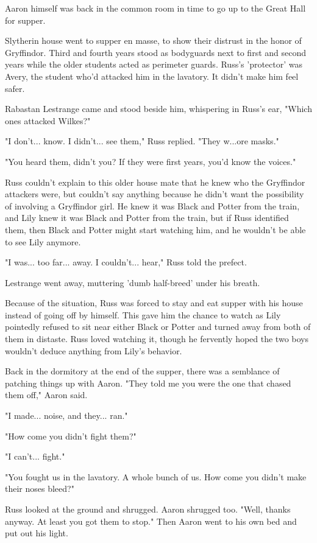 \documentclass[a4paper,11pt]{article}
\begin{document}
Aaron himself was back in the common room in time to go up to the Great Hall for supper.

Slytherin house went to supper en masse, to show their distrust in the honor of Gryffindor. Third and fourth years stood as bodyguards next to first and second years while the older students acted as perimeter guards. Russ's 'protector' was Avery, the student who'd attacked him in the lavatory. It didn't make him feel safer.

Rabastan Lestrange came and stood beside him, whispering in Russ's ear, "Which ones attacked Wilkes?"

"I don't... know. I didn't... see them," Russ replied. "They w...ore masks."

"You heard them, didn't you? If they were first years, you'd know the voices."

Russ couldn't explain to this older house mate that he knew who the Gryffindor attackers were, but couldn't say anything because he didn't want the possibility of involving a Gryffindor girl. He knew it was Black and Potter from the train, and Lily knew it was Black and Potter from the train, but if Russ identified them, then Black and Potter might start watching him, and he wouldn't be able to see Lily anymore.

"I was... too far... away. I couldn't... hear," Russ told the prefect.

Lestrange went away, muttering 'dumb half-breed' under his breath.

Because of the situation, Russ was forced to stay and eat supper with his house instead of going off by himself. This gave him the chance to watch as Lily pointedly refused to sit near either Black or Potter and turned away from both of them in distaste. Russ loved watching it, though he fervently hoped the two boys wouldn't deduce anything from Lily's behavior.

Back in the dormitory at the end of the supper, there was a semblance of patching things up with Aaron. "They told me you were the one that chased them off," Aaron said.

"I made... noise, and they... ran."

"How come you didn't fight them?"

"I can't... fight."

"You fought us in the lavatory. A whole bunch of us. How come you didn't make their noses bleed?"

Russ looked at the ground and shrugged. Aaron shrugged too. "Well, thanks anyway. At least you got them to stop." Then Aaron went to his own bed and put out his light.
\end{document}
